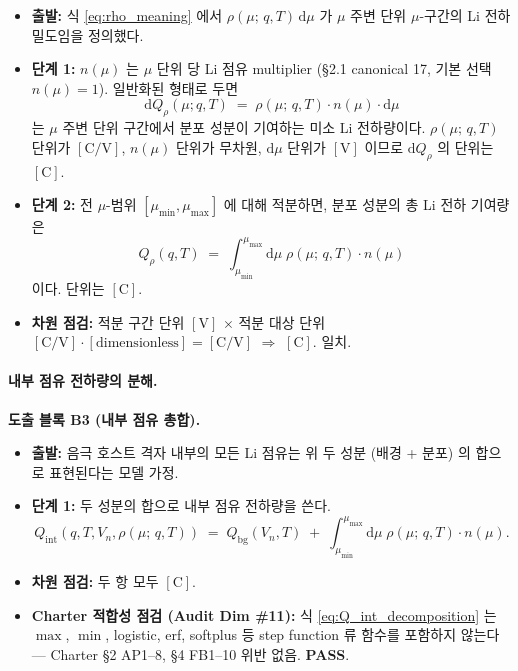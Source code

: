 \documentclass[11pt,a4paper]{article}
\newcommand{\dd}{\mathrm{d}}
\newcommand{\bg}{\mathrm{bg}}
\newcommand{\Cunit}{\mathrm{C}}
\newcommand{\mucont}{\mu}
\newcommand{\rhomu}{\rho(\mucont;\, q, T)}
\newcommand{\nmu}{n(\mucont)}
\begin{document}
\begin{itemize}
\item \textbf{출발:} 식 \eqref{eq:rho_meaning} 에서 $\rhomu \, \dd\mucont$ 가
      $\mucont$ 주변 단위 $\mucont$-구간의 Li 전하 밀도임을 정의했다.
\item \textbf{단계 1:} $\nmu$ 는 $\mucont$ 단위 당 Li 점유 multiplier (\S 2.1
      canonical 17, 기본 선택 $\nmu = 1$). 일반화된 형태로 두면
      \begin{equation}
      \dd Q_{\rho}(\mucont; q, T) \;=\; \rhomu \cdot \nmu \cdot \dd\mucont
      \label{eq:dQ_rho_def}
      \end{equation}
      는 $\mucont$ 주변 단위 구간에서 분포 성분이 기여하는 미소 Li 전하량이다.
      $\rhomu$ 단위가 $[\Cunit/\mathrm{V}]$, $\nmu$ 단위가 무차원, $\dd\mucont$
      단위가 $[\mathrm{V}]$ 이므로 $\dd Q_{\rho}$ 의 단위는 $[\Cunit]$.
\item \textbf{단계 2:} 전 $\mucont$-범위 $[\mucont_{\min}, \mucont_{\max}]$ 에 대해
      적분하면, 분포 성분의 총 Li 전하 기여량은
      \begin{equation}
      Q_{\rho}(q, T)
      \;=\;
      \int_{\mucont_{\min}}^{\mucont_{\max}} \dd\mucont\;\rhomu \cdot \nmu
      \label{eq:Q_rho_total}
      \end{equation}
      이다. 단위는 $[\Cunit]$.
\item \textbf{차원 점검:} 적분 구간 단위 $[\mathrm{V}]$ $\times$ 적분 대상 단위
      $[\Cunit/\mathrm{V}] \cdot [\mathrm{dimensionless}] = [\Cunit/\mathrm{V}]$
      $\Rightarrow$ $[\Cunit]$. 일치.
\end{itemize}

\paragraph{내부 점유 전하량의 분해.}

\textbf{도출 블록 B3 (내부 점유 총합).}

\begin{itemize}
\item \textbf{출발:} 음극 호스트 격자 내부의 모든 Li 점유는 위 두 성분 (배경 +
      분포) 의 합으로 표현된다는 모델 가정.
\item \textbf{단계 1:} 두 성분의 합으로 내부 점유 전하량을 쓴다.
      \begin{equation}
      Q_{\mathrm{int}}(q, T, V_n, \rhomu)
      \;=\;
      Q_{\bg}(V_n, T)
      \;+\;
      \int_{\mucont_{\min}}^{\mucont_{\max}} \dd\mucont\;
      \rhomu \cdot \nmu .
      \label{eq:Q_int_decomposition}
      \end{equation}
\item \textbf{차원 점검:} 두 항 모두 $[\Cunit]$.
\item \textbf{Charter 적합성 점검 (Audit Dim \#11):} 식
      \eqref{eq:Q_int_decomposition} 는 $\max$, $\min$, logistic, erf, softplus
      등 step function 류 함수를 포함하지 않는다 — Charter \S 2 AP1--8, \S 4
      FB1--10 위반 없음. \textbf{PASS}.
\end{itemize}
\end{document}
